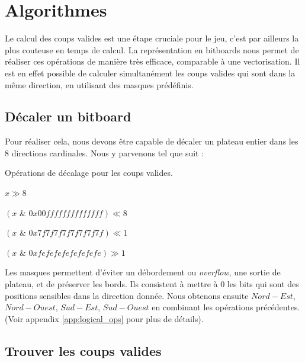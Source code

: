 \section{Algorithmes}
\label{sec:algo}
Le calcul des coups valides est une étape cruciale pour le jeu, c'est par ailleurs la plus couteuse en temps de calcul. La représentation en bitboards nous permet de réaliser ces opérations de manière très efficace, comparable à une vectorisation. Il est en effet possible de calculer simultanément les coups valides qui sont dans la même direction, en utilisant des masques prédéfinis.
\subsection{Décaler un bitboard}
\label{subsec:shift}
Pour réaliser cela, nous devons être capable de décaler un plateau entier dans les 8 directions cardinales. Nous y parvenons tel que suit :
\begin{algorithm}
    \caption{Opérations de décalage pour les coups valides.}
    \begin{algorithmic}[1]
        \State \Return $x \gg 8$
    \EndFunction
    
        \State \Return $(x \,\, \& \,\, 0x00ffffffffffffff) \ll 8$
    \EndFunction
    
        \State \Return $(x \,\, \& \,\, 0x7f7f7f7f7f7f7f7f) \ll 1$
    \EndFunction
    
        \State \Return $(x \,\, \& \,\, 0xfefefefefefefefe) \gg 1$
    \EndFunction
    \end{algorithmic}
    \label{alg:shift_ops}
\end{algorithm}

Les masques permettent d'éviter un débordement ou \textit{overflow}, une sortie de plateau, et de préserver les bords. Ils consistent à mettre à 0 les bits qui sont des positions sensibles dans la direction donnée. Nous obtenons ensuite $Nord-Est$, $Nord-Ouest$, $Sud-Est$, $Sud-Ouest$ en combinant les opérations précédentes. (Voir appendix \ref{app:logical_ops} pour plus de détails).

\subsection{Trouver les coups valides}
\label{subsec:valid_moves}


